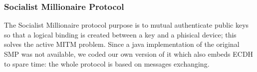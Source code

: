 \subsubsection{Socialist Millionaire Protocol}
The Socialist Millionaire protocol purpose is to mutual authenticate public keys so that a logical binding is created between a key and a phisical device; this solves the active MITM problem. Since a java implementation of the original SMP was not available, we coded our own version of it which also embeds ECDH to spare time: the whole protocol is based on messages exchanging.